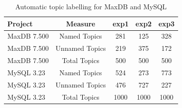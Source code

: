 \documentclass[]{sig-alternate}
\begin{document}
\begin{table}

	\centering
\begin{tabular}{l|c|c|c|c}
\toprule
Project & Measure & \textsf{exp1} & \textsf{exp2} & \textsf{exp3} \\
\midrule



MaxDB 7.500 & Named Topics   & 281 & 125 & 328 \\ %
MaxDB 7.500 & Unnamed Topics & 219  & 375 &  172  \\
MaxDB 7.500 & Total  Topics  & 500 & 500 & 500 \\
\midrule
MySQL 3.23  & Named Topics   & 524 & 273 & 773 \\
MySQL 3.23  & Unnamed Topics & 476 & 727 & 227 \\
MySQL 3.23  & Total  Topics  & 1000 & 1000 & 1000 \\


\bottomrule
\end{tabular}
	\caption{Automatic topic labelling for MaxDB and MySQL}%
	\label{tbl:wordlist}

\end{table}
\end{document}
